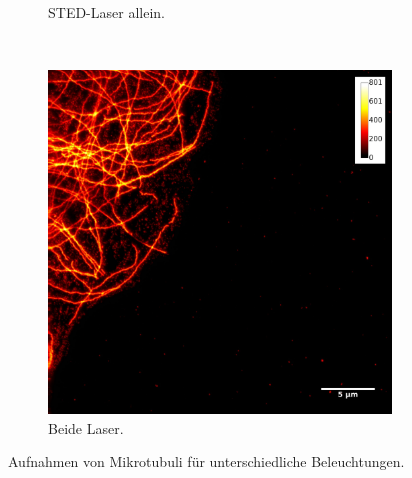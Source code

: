 \begin{figure}
\begin{subfigure}{0.3\textwidth}
	\caption{STED-Laser allein.}\label{fig:onlysted}
\end{subfigure}
~
\begin{subfigure}{0.3\textwidth}
	\includegraphics[width=\textwidth]{plots/normal_STED_measurement_with_bar.jpg}
	\caption{Beide Laser.}\label{fig:tubuli_sted}
\end{subfigure}
\caption{Aufnahmen von Mikrotubuli für unterschiedliche Beleuchtungen.}
\end{figure}
